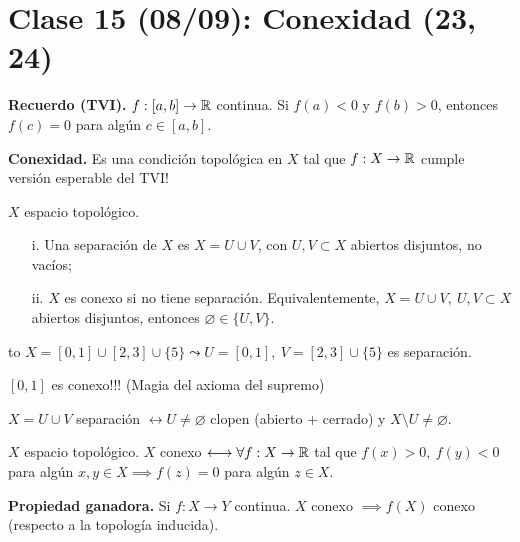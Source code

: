 \section{Clase 15 (08/09): Conexidad (23, 24)}

\textbf{Recuerdo (TVI).} $f: [a,b] \to \mathbb{R}$ continua. Si $f(a) < 0$ y $f(b) > 0$, entonces $f(c) = 0$ para algún $c \in [a,b]$. \newline

\noindent \textbf{Conexidad.} Es una condición topológica en $X$ tal que $f: X \to \mathbb{R}$ cumple versión esperable del TVI!

\begin{definition}
	$X$ espacio topológico.
	\begin{enumerate}
		\item[i.] Una separación de $X$ es $X = U \cup V$, con $U,V \subset X$ abiertos disjuntos, no vacíos;

		\item[ii.] $X$ es conexo si no tiene separación. Equivalentemente, $X = U \cup V,\ U,V \subset X$ abiertos disjuntos, entonces $\varnothing \in \{ U, V \}$.
	\end{enumerate}
\end{definition}


\begin{eg}[i.]to
	$X = [0,1] \cup [2,3] \cup \{5\} \leadsto U = [0,1],\ V = [2,3] \cup \{5\}$ es separación.   
\end{eg}

\begin{eg}[ii.]
	$[0,1]$ es conexo!!! (Magia del axioma del supremo) \\
\end{eg}

\begin{observe}
	$X = U \cup V$ separación $\longleftrightarrow U \neq \varnothing$ clopen (abierto + cerrado) y $X \setminus U \neq \varnothing$.
\end{observe}

\begin{lemma}
	$X$ espacio topológico. $X$ conexo $\longleftrightarrow \forall f: X \to \mathbb{R}$ tal que $f(x) > 0,\ f(y) < 0$ para algún $x,y \in X \implies f(z) = 0$ para algún $z \in X$.
\end{lemma}

\text{}

\noindent \textbf{Propiedad ganadora.} Si $f: X \to Y$ continua. $X$ conexo $\implies f(X)$ conexo (respecto a la topología inducida).

